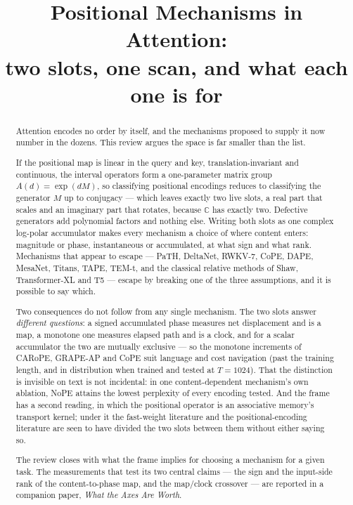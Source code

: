 \documentclass[11pt]{article}
\title{Positional Mechanisms in Attention:\\
\large two slots, one scan, and what each one is for}
\date{}
\author{}
\newcommand{\C}{\mathbb{C}}
\begin{document}
\maketitle

\begin{abstract}
\noindent
Attention encodes no order by itself, and the mechanisms proposed to supply it now
number in the dozens. This review argues the space is far smaller than the list.

If the positional map is linear in the query and key, translation-invariant and
continuous, the interval operators form a one-parameter matrix group
$A(d)=\exp(dM)$, so classifying positional encodings reduces to classifying the
generator $M$ up to conjugacy --- which leaves exactly two live slots, a real part
that scales and an imaginary part that rotates, because $\C$ has exactly two.
Defective generators add polynomial factors and nothing else. Writing both slots as
one complex log-polar accumulator makes every mechanism a choice of where content
enters: magnitude or phase, instantaneous or accumulated, at what sign and what rank.
Mechanisms that appear to escape --- PaTH, DeltaNet, RWKV-7, CoPE, DAPE, MesaNet,
Titans, TAPE, TEM-t, and the classical relative methods of Shaw, Transformer-XL and
T5 --- escape by breaking one of the three assumptions, and it is possible to say
which.

Two consequences do not follow from any single mechanism. The two slots answer
\emph{different questions}: a signed accumulated phase measures net displacement and
is a map, a monotone one measures elapsed path and is a clock, and for a scalar
accumulator the two are mutually exclusive --- so the monotone increments of CARoPE,
GRAPE-AP and CoPE suit language and cost navigation (past the training length, and in distribution when trained and tested at $T=1024$). That the distinction is invisible
on text is not incidental: in one content-dependent mechanism's own ablation, NoPE
attains the lowest perplexity of every encoding tested. And the frame has a second
reading, in which the positional operator is an associative memory's transport
kernel; under it the fast-weight literature and the positional-encoding literature
are seen to have divided the two slots between them without either saying so.

The review closes with what the frame implies for choosing a mechanism for a given
task. The measurements that test its two central claims --- the sign and the
input-side rank of the content-to-phase map, and the map/clock crossover --- are
reported in a companion paper, \emph{What the Axes Are Worth}.


\end{abstract}
\end{document}
